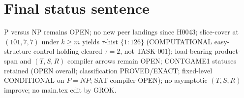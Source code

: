 \documentclass[11pt]{article}
\begin{document}
\section*{Final status sentence}
P versus NP remains OPEN; no new peer landings since H0043; slice-cover at $(101,7,7)$ under
$k{\ge}m$ yields $\tau$-hist $\{1{:}126\}$ (COMPUTATIONAL easy-structure control holding
cleared $\tau{=}2$, not TASK-001); load-bearing product-span and $(T,S,R)$ compiler arrows remain OPEN;
CONTGAME1 statuses retained (OPEN overall; classification PROVED/EXACT; fixed-level CONDITIONAL on $P{=}NP$;
SAT-compiler OPEN); no asymptotic $(T,S,R)$ improve; no main.tex edit by GROK.
\end{document}
